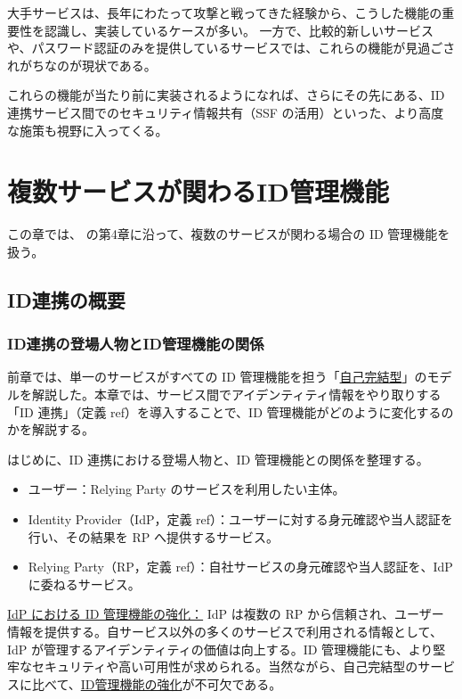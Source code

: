 \documentclass[uplatex]{jsarticle}
\def\ref#1{ref}%
\begin{document}
大手サービスは、長年にわたって攻撃と戦ってきた経験から、こうした機能の重要性を認識し、実装しているケースが多い。
一方で、比較的新しいサービスや、パスワード認証のみを提供しているサービスでは、これらの機能が見過ごされがちなのが現状である。

これらの機能が当たり前に実装されるようになれば、さらにその先にある、ID 連携サービス間でのセキュリティ情報共有（SSF の活用）といった、より高度な施策も視野に入ってくる。

\section{複数サービスが関わるID管理機能}

この章では、\cite{Ito2026} の第4章に沿って、複数のサービスが関わる場合の ID 管理機能を扱う。

\subsection{ID連携の概要}

\subsubsection{ID連携の登場人物とID管理機能の関係}

前章では、単一のサービスがすべての ID 管理機能を担う「\underline{自己完結型}」のモデルを解説した。本章では、サービス間でアイデンティティ情報をやり取りする「ID 連携」（定義 \ref{dfn:identity-federation}）を導入することで、ID 管理機能がどのように変化するのかを解説する。

はじめに、ID 連携における登場人物と、ID 管理機能との関係を整理する。
\begin{itemize}
\item ユーザー：Relying Party のサービスを利用したい主体。
\item Identity Provider（IdP，定義 \ref{dfn:idp}）：ユーザーに対する身元確認や当人認証を行い、その結果を RP へ提供するサービス。
\item Relying Party（RP，定義 \ref{dfn:rp}）：自社サービスの身元確認や当人認証を、IdP に委ねるサービス。
\end{itemize}

\underline{IdP における ID 管理機能の強化：}
IdP は複数の RP から信頼され、ユーザー情報を提供する。自サービス以外の多くのサービスで利用される情報として、IdP が管理するアイデンティティの価値は向上する。ID 管理機能にも、より堅牢なセキュリティや高い可用性が求められる。当然ながら、自己完結型のサービスに比べて、\underline{ID管理機能の強化}が不可欠である。
\end{document}
